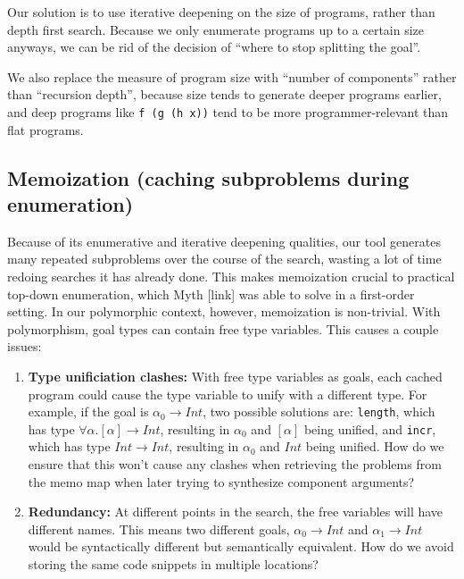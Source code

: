 \documentclass[acmsmall,nonacm]{acmart}
\begin{document}
Our solution is to use iterative deepening on the size of programs, 
rather than depth first search. Because we only enumerate programs up 
to a certain size anyways, we can be rid of the decision of ``where to 
stop splitting the goal''.

We also replace the measure of program size with ``number of components'' 
rather than ``recursion depth'', because size tends to generate deeper 
programs earlier, and deep programs like \texttt{f (g (h x))} tend to 
be more programmer-relevant than flat programs.



\subsection{Memoization (caching subproblems during enumeration)}

Because of its enumerative and iterative deepening qualities, our tool 
generates many repeated subproblems
over the course of the search, wasting a lot of time redoing searches it has
already done. This makes memoization crucial to practical 
top-down enumeration, which Myth [link] was able to solve in a 
first-order setting.
In our polymorphic context, however, memoization is non-trivial. 
With polymorphism, goal types can contain free 
type variables. This causes a couple issues:

\begin{enumerate}
  \item \textbf{Type unificiation clashes:} With free type variables as
        goals, each cached program could cause the
        type variable to unify with a different type. For example,
        if the goal is $\alpha_0 \to Int$, two possible solutions
        are: \verb|length|, which has type $\forall \alpha . [\alpha] \to Int$,
        resulting in $\alpha_0$ and $[\alpha]$ being unified, and 
        \verb|incr|, which has type $Int \to Int$,
        resulting in $\alpha_0$ and $Int$ being unified. How do we ensure 
        that this won't cause any clashes when retrieving the problems from 
        the memo map when later trying to synthesize component arguments?
  \item \textbf{Redundancy:} At different points in the search, the free
        variables will have different names. This means two different goals,
        $\alpha_0 \to Int$ and $\alpha_1 \to Int$ would be syntactically different
        but semantically equivalent. How do we avoid storing the same code 
        snippets in multiple locations? 
\end{enumerate}
\end{document}
